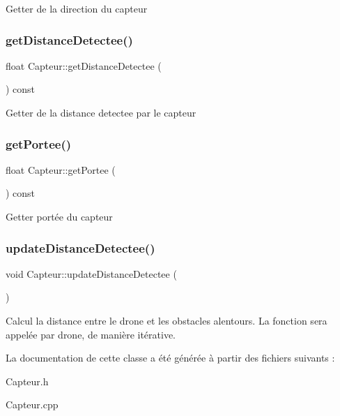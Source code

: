 Getter de la direction du capteur \mbox{\label{class_capteur_a7b56d66e80c4de6c796b32bc978475e9}} 
\subsubsection{\texorpdfstring{get\+Distance\+Detectee()}{getDistanceDetectee()}}
{\footnotesize\ttfamily float Capteur\+::get\+Distance\+Detectee (\begin{DoxyParamCaption}{ }\end{DoxyParamCaption}) const}

Getter de la distance detectee par le capteur \mbox{\label{class_capteur_a6022e941e6ebe7d3472a28802ef0b4c0}} 
\subsubsection{\texorpdfstring{get\+Portee()}{getPortee()}}
{\footnotesize\ttfamily float Capteur\+::get\+Portee (\begin{DoxyParamCaption}{ }\end{DoxyParamCaption}) const}

Getter portée du capteur \mbox{\label{class_capteur_a0e4afe7bdc6e27985564cf69daedca07}} 
\subsubsection{\texorpdfstring{update\+Distance\+Detectee()}{updateDistanceDetectee()}}
{\footnotesize\ttfamily void Capteur\+::update\+Distance\+Detectee (\begin{DoxyParamCaption}{ }\end{DoxyParamCaption})}

Calcul la distance entre le drone et les obstacles alentours. La fonction sera appelée par drone, de manière itérative. 

La documentation de cette classe a été générée à partir des fichiers suivants \+:\begin{DoxyCompactItemize}
\item 
Capteur.\+h\item 
Capteur.\+cpp\end{DoxyCompactItemize}
